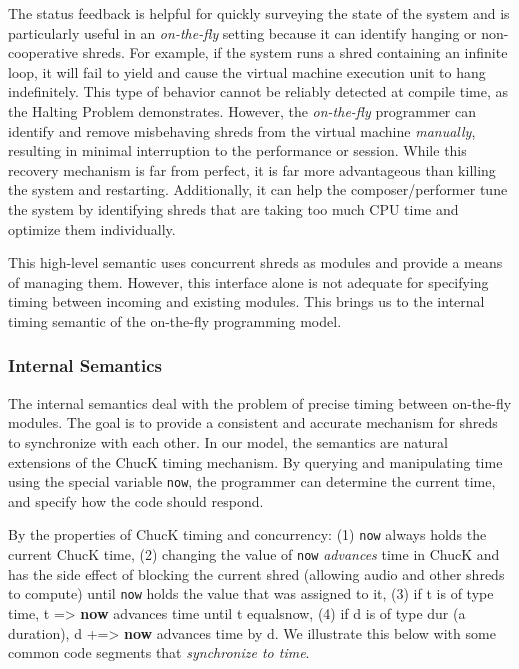 The status feedback is helpful for quickly surveying the state of the system and is particularly useful in an \textit{on-the-fly} setting because it can identify hanging or non-cooperative shreds.   For example, if the system runs a shred containing an infinite loop, it will fail to yield and cause the virtual machine execution unit to hang indefinitely.  This type of behavior cannot be reliably detected at compile time, as the Halting Problem demonstrates.  However, the \textit{on-the-fly} programmer can identify and remove misbehaving shreds from the virtual machine \textit{manually}, resulting in minimal interruption to the performance or session.  While this recovery mechanism is far from perfect, it is far more advantageous than killing the system and restarting.  Additionally, it can help the composer/performer tune the system by identifying shreds that are taking too much CPU time and optimize them individually.

This high-level semantic uses concurrent shreds as modules and provide a means of managing them.  However, this interface alone is not adequate for specifying timing between incoming and existing modules.  This brings us to the internal timing semantic of the on-the-fly programming model.

\subsubsection{ Internal Semantics}

The internal semantics deal with the problem of precise timing between on-the-fly modules.  The goal is to provide a consistent and accurate mechanism for shreds to synchronize with each other.  In our model, the semantics are natural extensions of the ChucK timing mechanism.  By querying and manipulating time using the special variable \verb!now!, the programmer can determine the current time, and specify how the code should respond.

By the properties of ChucK timing and concurrency:  (1) \verb!now! always holds the current ChucK time, (2) changing the value of \verb!now! \textit{advances} time in ChucK and has the side effect of blocking the current shred (allowing audio and other shreds to compute) until \verb!now! holds the value that was assigned to it,  (3) if {\small t} is of type {\small time}, {\small t => \textbf{now}} advances time until {\small t }equals{\small  now}, (4) if {\small d} is of type {\small dur }(a duration), {\small d +=> \textbf{now}} advances time by {\small d}.  We illustrate this below with some common code segments that \textit{synchronize to time}.

